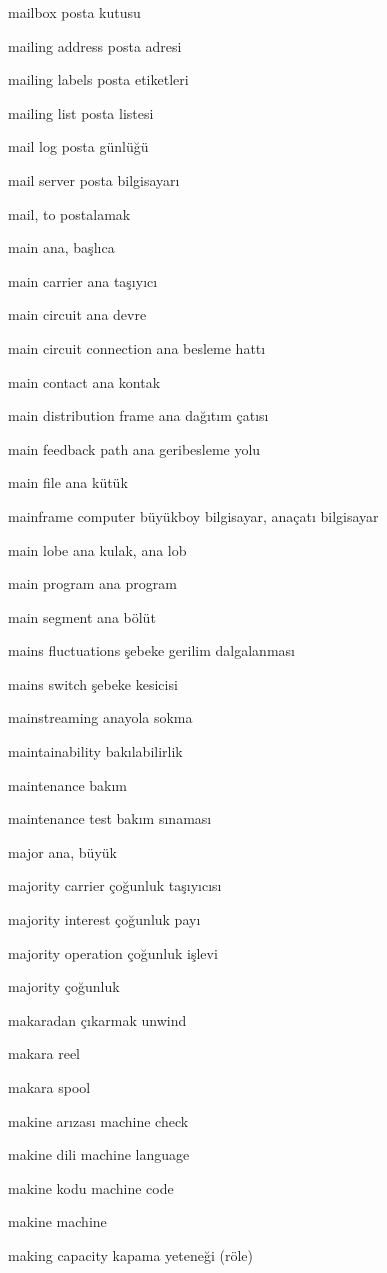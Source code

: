 \documentclass[12pt,fleqn]{article}\usepackage{../../common}
\begin{document}
mailbox posta kutusu

mailing address posta adresi

mailing labels posta etiketleri

mailing list posta listesi

mail log posta günlüğü

mail server posta bilgisayarı

mail, to postalamak

main ana, başlıca

main carrier ana taşıyıcı

main circuit ana devre

main circuit connection ana besleme hattı

main contact ana kontak

main distribution frame ana dağıtım çatısı

main feedback path ana geribesleme yolu

main file ana kütük

mainframe computer büyükboy bilgisayar, anaçatı bilgisayar

main lobe ana kulak, ana lob

main program ana program

main segment ana bölüt

mains fluctuations şebeke gerilim dalgalanması

mains switch şebeke kesicisi

mainstreaming anayola sokma

maintainability bakılabilirlik

maintenance bakım

maintenance test bakım sınaması

major ana, büyük

majority carrier çoğunluk taşıyıcısı

majority interest çoğunluk payı

majority operation çoğunluk işlevi

majority çoğunluk

makaradan çıkarmak unwind

makara reel

makara spool

makine arızası machine check

makine dili machine language

makine kodu machine code

makine machine

making capacity kapama yeteneği (röle)
\end{document}
